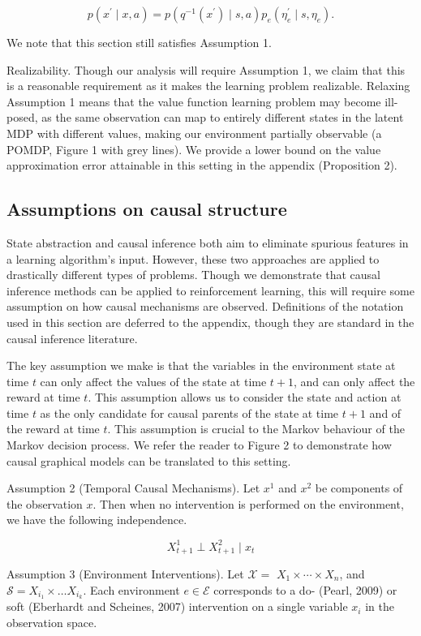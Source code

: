 \documentclass[10pt]{article}
\begin{document}
\[
p\left(x^{\prime} \mid x, a\right)=p\left(q^{-1}\left(x^{\prime}\right) \mid s, a\right) p_{e}\left(\eta_{e}^{\prime} \mid s, \eta_{e}\right) .
\]

We note that this section still satisfies Assumption 1.

Realizability. Though our analysis will require Assumption 1, we claim that this is a reasonable requirement as it makes the learning problem realizable. Relaxing Assumption 1 means that the value function learning problem may become ill-posed, as the same observation can map to entirely different states in the latent MDP with different values, making our environment partially observable (a POMDP, Figure 1 with grey lines). We provide a lower bound on the value approximation error attainable in this setting in the appendix (Proposition 2).

\subsection{Assumptions on causal structure}
State abstraction and causal inference both aim to eliminate spurious features in a learning algorithm's input. However, these two approaches are applied to drastically different types of problems. Though we demonstrate that causal inference methods can be applied to reinforcement learning, this will require some assumption on how causal mechanisms are observed. Definitions of the notation used in this section are deferred to the appendix, though they are standard in the causal inference literature.

The key assumption we make is that the variables in the environment state at time $t$ can only affect the values of the state at time $t+1$, and can only affect the reward at time $t$. This assumption allows us to consider the state and action at time $t$ as the only candidate for causal parents of the state at time $t+1$ and of the reward at time $t$. This assumption is crucial to the Markov behaviour of the Markov decision process. We refer the reader to Figure 2 to demonstrate how causal graphical models can be translated to this setting.

Assumption 2 (Temporal Causal Mechanisms). Let $x^{1}$ and $x^{2}$ be components of the observation $x$. Then when no intervention is performed on the environment, we have the following independence.

\[
X_{t+1}^{1} \perp X_{t+1}^{2} \mid x_{t}
\]

Assumption 3 (Environment Interventions). Let $\mathcal{X}=$ $X_{1} \times \cdots \times X_{n}$, and $\mathcal{S}=X_{i_{1}} \times \ldots X_{i_{k}}$. Each environment $e \in \mathcal{E}$ corresponds to a do- (Pearl, 2009) or soft (Eberhardt and Scheines, 2007) intervention on a single variable $x_{i}$ in the observation space.
\end{document}
